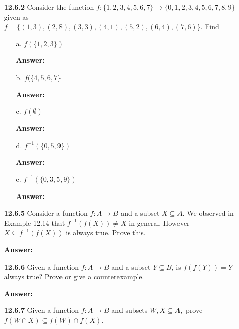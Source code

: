\documentclass[11pt]{report}
\theoremstyle{plain}
\begin{document}
\begin{enumerate}
\vspace{1in}

\item[\textbf{12.6.2}] Consider the function $f : \{1,2,3,4,5,6,7\} \to \{0,1,2,3,4,5,6,7,8,9\}$ given as \\$f =\{(1,3), (2,8), (3,3), (4,1), (5,2), (6,4), (7,6)\}.$  Find 
	\begin{enumerate}
	\item[a.] $f(\{1,2,3\})$
	
	\textbf{Answer:} \\
	
	\item[b.] $ f (\{4,5,6,7\}$
	
	\textbf{Answer:} \\
	
	\item[c.] $f(\emptyset)$
	
	\textbf{Answer:} \\
	
	\item[d.] $f^{-1}(\{0,5,9\})$
	
	\textbf{Answer:} \\
	
	\item[e.] $f^{-1}(\{0,3,5,9\})$
	
	\textbf{Answer:} \\
	\end{enumerate}
	
\vspace{1in}

\item[\textbf{12.6.5}] Consider a function $f : A \to B$ and a subset $X \subseteq A.$ We observed in Example 12.14 that $f^{-1}(f (X)) \not = X$ in general. However $X \subseteq f^{-1}(f (X))$ is always true. Prove this.

\textbf{Answer:} \\

\vspace{1in}

\item[\textbf{12.6.6}] Given a function $f : A \to B$ and a subset $Y \subseteq B$, is $f (f(Y)) = Y$ always true? Prove or give a counterexample.

\textbf{Answer:} \\

\vspace{1in}

\item[\textbf{12.6.7}] Given a function $f : A \to B$ and subsets $W, X \subseteq A,$ prove $f (W \cap X) \subseteq f (W)\cap f (X).$


\end{enumerate}
\end{document}
